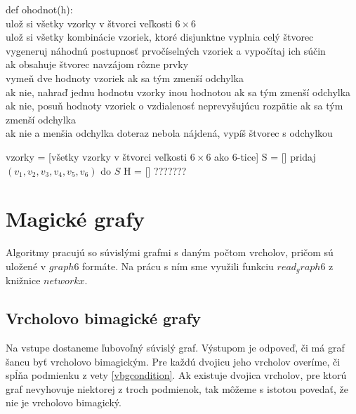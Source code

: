 \begin{subcode}
def ohodnot(h): \\
ulož si všetky vzorky v štvorci veľkosti $6 \times 6$ \\
ulož si všetky kombinácie vzoriek, ktoré disjunktne vyplnia celý štvorec \\
vygeneruj náhodnú postupnosť prvočíselných vzoriek a vypočítaj ich súčin \\
ak obsahuje štvorec navzájom rôzne prvky \\
vymeň dve hodnoty vzoriek ak sa tým zmenší odchylka \\
ak nie, nahraď jednu hodnotu vzorky inou hodnotou ak sa tým zmenší odchylka \\
ak nie, posuň hodnoty vzoriek o vzdialenosť neprevyšujúcu rozpätie ak sa tým zmenší odchylka \\
ak nie a menšia odchylka doteraz nebola nájdená, vypíš štvorec s odchylkou
\end{subcode}

\begin{algorithmic}
\STATE vzorky = [všetky vzorky v štvorci veľkosti $6 \times 6$ ako 6-tice]
\STATE S = []
	\STATE pridaj $(v_1,v_2,v_3,v_4,v_5,v_6)$ do $S$
    \ENDIF
\ENDFOR
\STATE H = []
\STATE ???????
\end{algorithmic}

\section{Magické grafy}

Algoritmy pracujú so súvislými grafmi s daným počtom vrcholov, pričom sú uložené v $graph6$ formáte. Na prácu s ním sme využili funkciu $read_graph6$ z knižnice $networkx$. \\

\subsection{Vrcholovo bimagické grafy}
 
\begin{subalg} Na vstupe dostaneme ľubovoľný súvislý graf. Výstupom je odpoveď, či má graf šancu byť vrcholovo bimagickým. Pre každú dvojicu jeho vrcholov overíme, či spĺňa podmienku z vety \ref{vbgcondition}. Ak existuje dvojica vrcholov, pre ktorú graf nevyhovuje niektorej z troch podmienok, tak môžeme s istotou povedať, že nie je vrcholovo bimagický.
\end{subalg}

